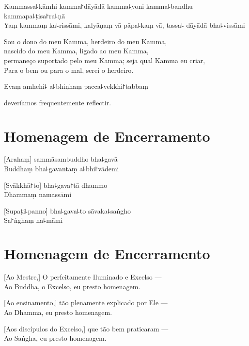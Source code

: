 \clearpage

%
Kammassa꜕kāmhi kamma꜓dāyādā kamma꜕yoni kamma꜕bandhu kammapa꜕ṭisa꜓ra꜕ṇā\\
Yaṃ kammaṃ ka꜕rissāmi, kalyāṇaṃ vā pāpa꜕kaṃ vā, tassa꜕ dāyādā bha꜕vissāmi

\begin{english}
  Sou o dono do meu Kamma, herdeiro do meu Kamma,\\
  nascido do meu Kamma, ligado ao meu Kamma,\\
  permaneço suportado pelo meu Kamma; seja qual Kamma eu criar,\\
  Para o bem ou para o mal,  serei o herdeiro.
\end{english}

Evaṃ amhehi꜕ a꜕bhiṇhaṃ pacca꜕vekkhi꜓tabbaṃ

\begin{english}
   deveríamos frequentemente reflectir.
\end{english}

\clearpage

\chapter*{Homenagem de Encerramento}

\delegateSetUseNext

[Arahaṃ] sammāsambuddho bha꜕gavā\\
Buddhaṃ bha꜕gavantaṃ a꜕bhi꜓vādemi 

[Svākkhā꜓to] bha꜕gava꜓tā dhammo\\
Dhammaṃ namassāmi 

[Supaṭi꜕panno] bha꜕gava꜕to sāvaka꜕saṅgho\\
Sa꜓ṅghaṃ na꜕māmi 

\clearpage

\chapter{Homenagem de Encerramento}

[Ao Mestre,] O perfeitamente Iluminado e Excelso ---\\
Ao Buddha, o Excelso, eu presto homenagem. 

[Ao ensinamento,] tão plenamente explicado por Ele ---\\
Ao Dhamma, eu presto homenagem. 

[Aos discípulos do Excelso,] que tão bem praticaram ---\\
Ao Saṅgha, eu presto homenagem. 

